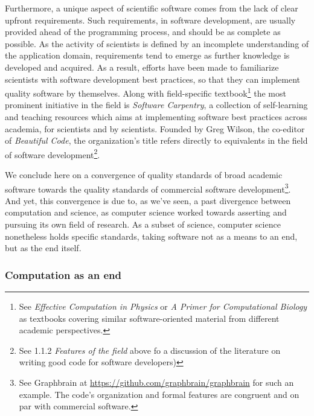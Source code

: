 Furthermore, a unique aspect of scientific software comes from the lack of clear upfront requirements. Such requirements, in software development, are usually provided ahead of the programming process, and should be as complete as possible. As the activity of scientists is defined by an incomplete understanding of the application domain, requirements tend to emerge as further knowledge is developed and acquired\cite{segal_when_2005}. As a result, efforts have been made to familiarize scientists with software development best practices, so that they can implement quality software by themselves. Along with field-specific textbook\footnote{See \emph{Effective Computation in Physics}\cite{scopatz_effective_2015} or \emph{A Primer for Computational Biology}\cite{oneil_primer_2019} as textbooks covering similar software-oriented material from different academic perspectives.} the most prominent initiative in the field is \emph{Software Carpentry}, a collection of self-learning and teaching resources which aims at implementing software best practices across academia, for scientists and by scientists. Founded by Greg Wilson, the co-editor of \emph{Beautiful Code}, the organization's title refers directly to equivalents in the field of software development\footnote{See 1.1.2 \emph{Features of the field} above fo a discussion of the literature on writing good code for software developers)}.

We conclude here on a convergence of quality standards of broad academic software towards the quality standards of commercial software development\footnote{See Graphbrain at \url{https://github.com/graphbrain/graphbrain} for such an example. The code's organization and formal features are congruent and on par with commercial software.}.  And yet, this convergence is due to, as we've seen, a past divergence between computation and science, as computer science worked towards asserting and pursuing its own field of research. As a subset of science, computer science nonetheless holds specific standards, taking software not as a means to an end, but as the end itself.

\vspace*{1\baselineskip}

\subsubsection{Computation as an end}

